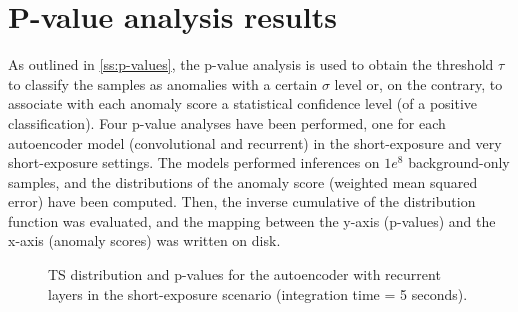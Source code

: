 \FloatBarrier
\section{P-value analysis results}
\label{s:p-values-results}
As outlined in \autoref{ss:p-values}, the p-value analysis is used to obtain the threshold $\tau$ to classify the samples as anomalies with a certain $\sigma$ level or, on the contrary, to associate with each anomaly score a statistical confidence level (of a positive classification). Four p-value analyses have been performed, one for each autoencoder model (convolutional and recurrent) in the short-exposure and very short-exposure settings. The models performed inferences on $1e^8$ background-only samples, and the distributions of the anomaly score (weighted mean squared error) have been computed. Then, the inverse cumulative of the distribution function was evaluated, and the mapping between the y-axis (p-values) and the x-axis (anomaly scores) was written on disk. 
\begin{figure}[!htb]
    \centering
    \begin{minipage}{0.5\textwidth}
        \centering
        
    \end{minipage}%
    \begin{minipage}{0.5\textwidth}
       \centering
       
    \end{minipage}
    \captionsetup{width=0.9\linewidth}
    \caption{TS distribution and p-values for the autoencoder with recurrent layers in the short-exposure scenario (integration time = 5 seconds).}
    \label{fig:ts-distribution-and-p-values-rnn-it-5}
\end{figure}


